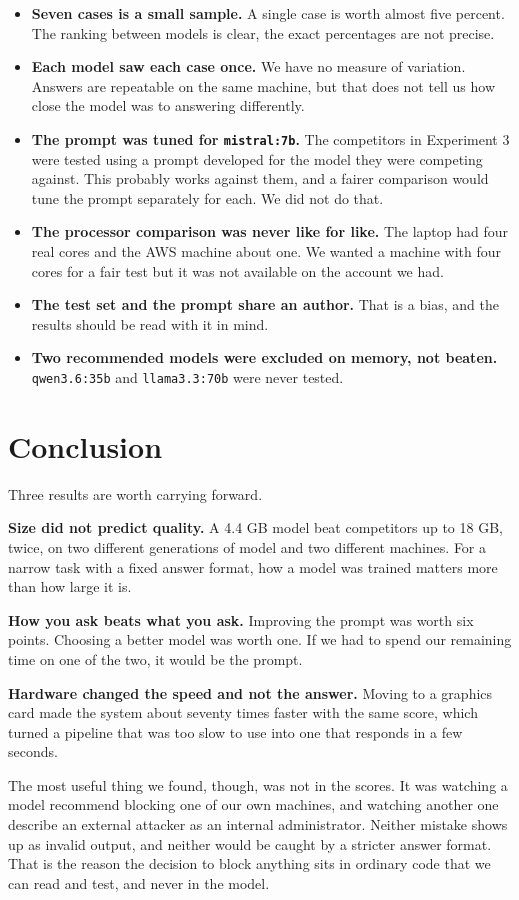 \documentclass[11pt,a4paper]{article}
\begin{document}
\begin{itemize}
  \item \textbf{Seven cases is a small sample.} A single case is worth almost five
        percent. The ranking between models is clear, the exact percentages are not
        precise.
  \item \textbf{Each model saw each case once.} We have no measure of variation.
        Answers are repeatable on the same machine, but that does not tell us how
        close the model was to answering differently.
  \item \textbf{The prompt was tuned for \texttt{mistral:7b}.} The competitors in
        Experiment 3 were tested using a prompt developed for the model they were
        competing against. This probably works against them, and a fairer comparison
        would tune the prompt separately for each. We did not do that.
  \item \textbf{The processor comparison was never like for like.} The laptop had
        four real cores and the AWS machine about one. We wanted a machine with four
        cores for a fair test but it was not available on the account we had.
  \item \textbf{The test set and the prompt share an author.} That is a bias, and the
        results should be read with it in mind.
  \item \textbf{Two recommended models were excluded on memory, not beaten.}
        \texttt{qwen3.6:35b} and \texttt{llama3.3:70b} were never tested.
\end{itemize}

\section{Conclusion}

Three results are worth carrying forward.

\textbf{Size did not predict quality.} A 4.4 GB model beat competitors up to 18 GB,
twice, on two different generations of model and two different machines. For a narrow
task with a fixed answer format, how a model was trained matters more than how large
it is.

\textbf{How you ask beats what you ask.} Improving the prompt was worth six points.
Choosing a better model was worth one. If we had to spend our remaining time on one
of the two, it would be the prompt.

\textbf{Hardware changed the speed and not the answer.} Moving to a graphics card
made the system about seventy times faster with the same score, which turned a
pipeline that was too slow to use into one that responds in a few seconds.

The most useful thing we found, though, was not in the scores. It was watching a
model recommend blocking one of our own machines, and watching another one describe an
external attacker as an internal administrator. Neither mistake shows up as invalid
output, and neither would be caught by a stricter answer format. That is the reason
the decision to block anything sits in ordinary code that we can read and test, and
never in the model.
\end{document}
